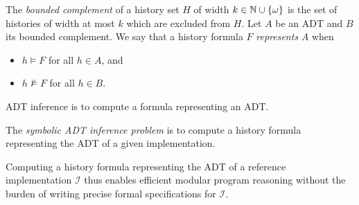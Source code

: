 The \emph{bounded complement} of a history set $H$ of width $k \in \mathbb{N} \cup
{\{{\omega}\}}$ is the set of histories of width at most $k$ which are excluded
from $H$. Let $A$ be an ADT and $B$ its bounded complement. We say that
a history formula $F$ \emph{represents} $A$ when
\begin{itemize}

  \item $h \models F$ for all $h \in A$, and

  \item $h \not\models F$ for all $h \in B$.

\end{itemize}
ADT inference is to compute a formula representing an ADT.

\begin{definition}

  The \emph{symbolic ADT inference problem} is to compute a history formula
  representing the ADT of a given implementation.

\end{definition}

Computing a history formula representing the ADT of a reference implementation
$\mathcal{I}$ thus enables efficient modular program reasoning without the
burden of writing precise formal specifications for $\mathcal{I}$.

